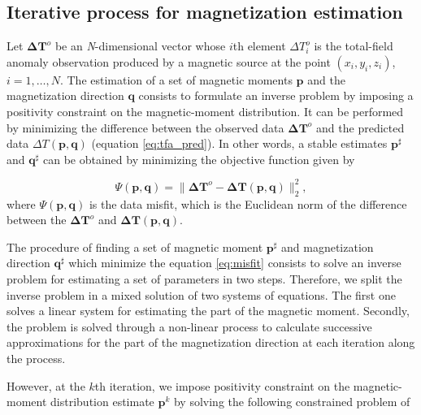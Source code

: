 \subsection{Iterative process for magnetization estimation}


Let $\mathbf{\Delta T}^o$ be an \textit{N}-dimensional vector whose $i$th element $\Delta T_i^o$ is the total-field anomaly observation produced by a magnetic source at the point $(x_i,y_i,z_i)$, $i = 1, \ldots, N$. The estimation of a set of magnetic moments $\mathbf{p}$ and the magnetization direction $\mathbf{q}$ consists to formulate an inverse problem by imposing a positivity constraint on the magnetic-moment distribution. It can be performed by minimizing the difference between the observed data $\mathbf{\Delta T}^o$ and the predicted data $\Delta T (\mathbf{p}, \mathbf{q})$ (equation \ref{eq:tfa_pred}). In other words, a stable estimates $\mathbf{p}^\sharp$ and $\mathbf{q}^\sharp$ can be obtained by minimizing the objective function given by

\begin{equation}
\Psi(\mathbf{p}, \mathbf{q}) =  \parallel \mathbf{\Delta T}^o - \mathbf{\Delta T} (\mathbf{p}, \mathbf{q}) \parallel_{2}^{2},
\label{eq:misfit}
\end{equation}
where $\Psi(\mathbf{p}, \mathbf{q})$ is the data misfit, which is the Euclidean norm of the difference between the $\mathbf{\Delta T}^o$ and $\mathbf{\Delta T} (\mathbf{p}, \mathbf{q})$.


The procedure of finding a set of magnetic moment $\mathbf{p}^\sharp$ and magnetization direction $\mathbf{q}^\sharp$ which minimize the equation \ref{eq:misfit} consists to solve an inverse problem for estimating a set of parameters in two steps. Therefore, we split the inverse problem in a mixed solution of two systems of equations. The first one solves a linear system for estimating the part of the magnetic moment. Secondly, the problem is solved through a non-linear process to calculate successive approximations for the part of the magnetization direction at each iteration along the process. 

However, at the $k$th iteration, we impose positivity constraint on the magnetic-moment distribution estimate $\mathbf{p}^k$ by solving the following constrained problem of

